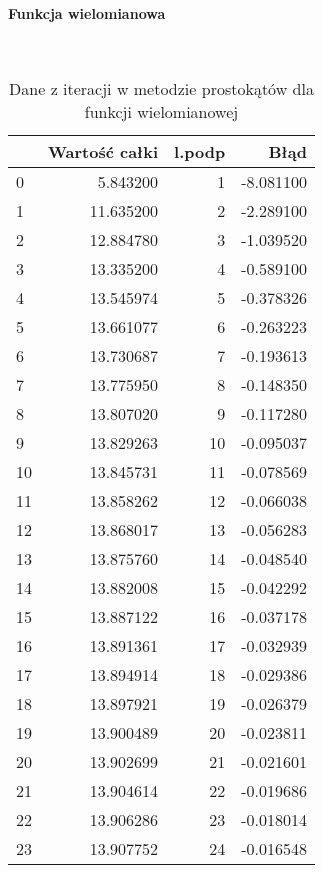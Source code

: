 \documentclass[12pt,twoside]{article}
\begin{document}
\paragraph{Funkcja wielomianowa}\mbox{} \\

\begin{table}[H]
\centering 
\caption{Dane z iteracji w metodzie prostokątów dla funkcji wielomianowej}
\label{tabela1.1}
\begin{tabular}{lrrr}
\toprule
{} &  Wartość całki &  l.podp &      Błąd \\
\midrule
0  &       5.843200 &       1 & -8.081100 \\
1  &      11.635200 &       2 & -2.289100 \\
2  &      12.884780 &       3 & -1.039520 \\
3  &      13.335200 &       4 & -0.589100 \\
4  &      13.545974 &       5 & -0.378326 \\
5  &      13.661077 &       6 & -0.263223 \\
6  &      13.730687 &       7 & -0.193613 \\
7  &      13.775950 &       8 & -0.148350 \\
8  &      13.807020 &       9 & -0.117280 \\
9  &      13.829263 &      10 & -0.095037 \\
10 &      13.845731 &      11 & -0.078569 \\
11 &      13.858262 &      12 & -0.066038 \\
12 &      13.868017 &      13 & -0.056283 \\
13 &      13.875760 &      14 & -0.048540 \\
14 &      13.882008 &      15 & -0.042292 \\
15 &      13.887122 &      16 & -0.037178 \\
16 &      13.891361 &      17 & -0.032939 \\
17 &      13.894914 &      18 & -0.029386 \\
18 &      13.897921 &      19 & -0.026379 \\
19 &      13.900489 &      20 & -0.023811 \\
20 &      13.902699 &      21 & -0.021601 \\
21 &      13.904614 &      22 & -0.019686 \\
22 &      13.906286 &      23 & -0.018014 \\
23 &      13.907752 &      24 & -0.016548 \\

\end{tabular}
\end{table}
\end{document}
